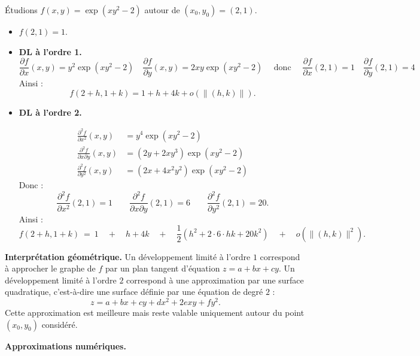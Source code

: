 \documentclass[11pt, class=report,crop=false]{standalone}
\begin{document}
\begin{exemple}
Étudions $f(x,y) = \exp(xy^2-2)$ autour de $(x_0,y_0) = (2,1)$.
\begin{itemize}
    \item $f(2,1) = 1$.
    
    \item \textbf{DL à l'ordre 1.}
    $$\frac{\partial f}{\partial x}(x,y) = y^2\exp(xy^2-2)
    \quad
    \frac{\partial f}{\partial y}(x,y) = 2xy\exp(xy^2-2)
    \quad\text{ donc }\quad
    \frac{\partial f}{\partial x}(2,1) = 1
    \quad
    \frac{\partial f}{\partial y}(2,1) = 4$$
    Ainsi :
    $$f(2+h,1+k) = 1 + h + 4k + o\left(\|(h,k)\|\right).$$
  
    \item \textbf{DL à l'ordre 2.} 
    
    \begin{align*}
    \frac{\partial ^2f}{\partial x^2}(x,y) &= y^4\exp(xy^2-2) \\
    \frac{\partial ^2f}{\partial x\partial y}(x,y) &= (2y+2xy^3)\exp(xy^2-2)\\
    \frac{\partial ^2f}{\partial y^2}(x,y) &= (2x+4x^2y^2)\exp(xy^2-2)
    \end{align*}
    Donc :
    $$\frac{\partial ^2f}{\partial x^2}(2,1) = 1\qquad 
    \frac{\partial ^2f}{\partial x\partial y}(2,1) = 6 \qquad
    \frac{\partial ^2f}{\partial y^2}(2,1) = 20.$$ 
    Ainsi :
    $$   
    f(2+h,1+k)  \ 
    = \  1 \quad + \quad h + 4k
    \quad +\quad
    \frac12\left(h^2
    +2\cdot 6 \cdot hk
    +20 k^2\right)
    \quad + \quad o\left(\|(h,k)\|^2\right).$$

\end{itemize}    
       
\end{exemple}    



\bigskip

\textbf{Interprétation géométrique.}
Un développement limité à l'ordre $1$ correspond à approcher le graphe de $f$ par un plan tangent d'équation $z=a +bx+cy$. 
Un développement limité à l'ordre $2$ correspond à une approximation par une surface quadratique, c'est-à-dire une surface définie par une équation de degré $2$ :
$$z=a +bx+cy + dx^2 + 2exy + fy^2.$$
Cette approximation est meilleure mais reste valable uniquement autour du point $(x_0,y_0)$ considéré.


\bigskip

\textbf{Approximations numériques.}
\end{document}
